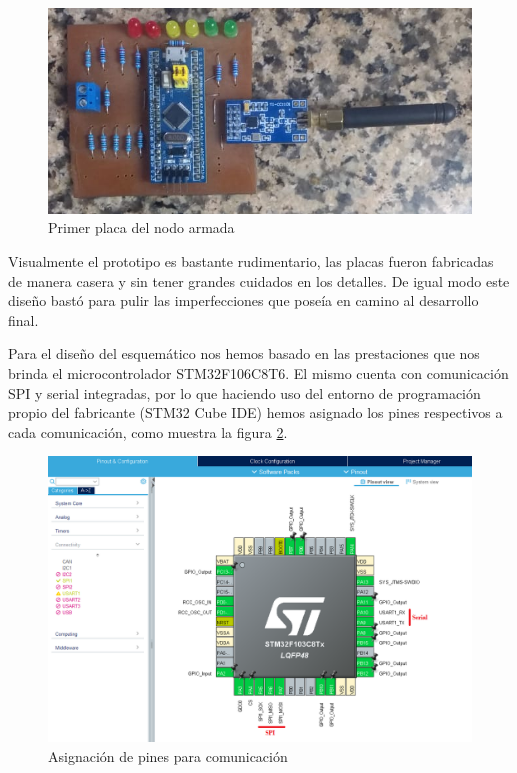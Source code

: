 \begin{figure}
	\centering
	\includegraphics[scale=0.53]{images/nodos/prototipo_nodo.png}
    \caption{Primer placa del nodo armada}
	\label{prototipo_nodo}
\end{figure}

Visualmente el prototipo es bastante rudimentario, las placas fueron fabricadas de manera casera y sin tener grandes
cuidados en los detalles. De igual modo este diseño bastó para pulir las imperfecciones que poseía en camino al desarrollo final.\par 
Para el diseño del esquemático nos hemos basado en las prestaciones que nos brinda el microcontrolador STM32F106C8T6. El mismo
cuenta con comunicación SPI y serial integradas, por lo que haciendo uso del entorno de programación propio del fabricante 
(STM32 Cube IDE) hemos asignado los pines respectivos a cada comunicación, como muestra la figura \ref{asignacion_pines}. \par

\begin{figure}
	\centering
	\includegraphics[scale=0.43]{images/nodos/asignacion_pines.png}
    \caption{Asignación de pines para comunicación}
	\label{asignacion_pines}
\end{figure}

